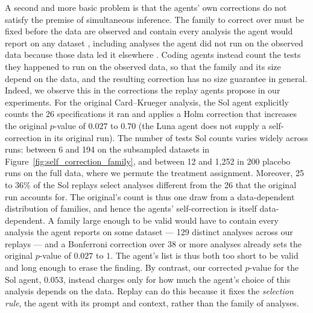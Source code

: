 \documentclass[10pt]{article}
\begin{document}
A second and more basic problem is that the agents' own corrections do not satisfy the premise of simultaneous inference. The family to correct over must be fixed before the data are observed and contain every analysis the agent would report on any dataset \citep{berk2013valid, kuchibhotla2022post},  including analyses the agent did not run on the observed data because those data led it elsewhere \citep{gelman2014statistical}.
Coding agents instead count the tests they happened to run on the observed data, so that the family and its size depend on the data, and the resulting correction has no size guarantee in general. Indeed, we observe this in the corrections the replay agents propose in our experiments. For the original Card--Krueger analysis, the Sol agent explicitly counts the 26 specifications it ran and applies a Holm correction that increases the original $p$-value of $0.027$ to $0.70$ (the Luna agent does not supply a self-correction in its original run). The number of tests Sol counts varies widely across runs: between 6 and 194 on the subsampled datasets in Figure~\ref{fig:self_correction_family}, and between 12 and 1,252 in 200 placebo runs on the full data, where we permute the treatment assignment. Moreover, 25 to 36\% of the Sol replays select analyses different from the 26 that the original run accounts for. The original's count is thus one draw from a data-dependent distribution of families, and hence the agents' self-correction is itself data-dependent.
A family large enough to be valid would have to contain every analysis the agent reports on some dataset --- 129 distinct analyses across our replays --- and a Bonferroni correction over 38 or more analyses already sets the original $p$-value of $0.027$ to $1$. The agent’s list is thus both too short to be valid and long enough to erase the finding. By contrast, our corrected $p$-value for the Sol agent, $0.053$, instead charges only for how much the agent's choice of this analysis depends on the data. Replay can do this because it fixes the \textit{selection rule}, the agent with its prompt and context, rather than the family of analyses.
\end{document}
